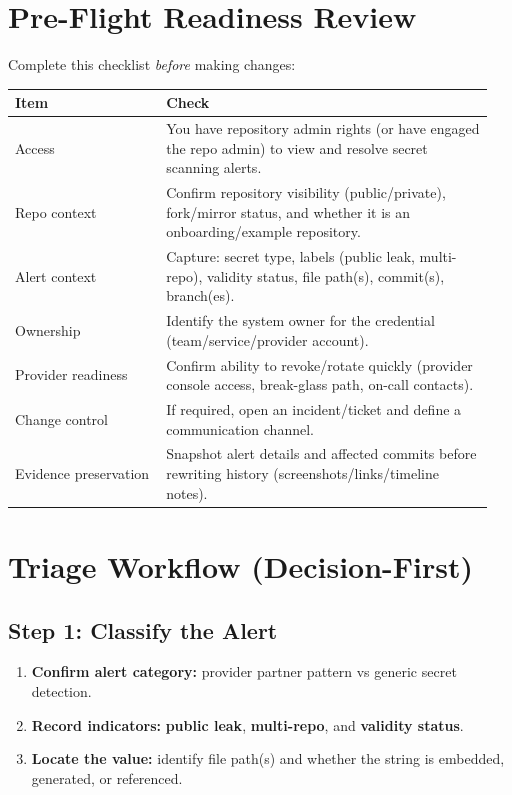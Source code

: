 \documentclass[11pt]{article}
\providecommand{\term}[1]{\textbf{#1}}
\begin{document}
\section{Pre-Flight Readiness Review}
Complete this checklist \emph{before} making changes:
\begin{longtable}{@{}p{0.30\linewidth}p{0.65\linewidth}@{}}
\toprule
\textbf{Item} & \textbf{Check} \\
\midrule
Access & You have repository admin rights (or have engaged the repo admin) to view and resolve secret scanning alerts. \\
Repo context & Confirm repository visibility (public/private), fork/mirror status, and whether it is an onboarding/example repository. \\
Alert context & Capture: secret type, labels (public leak, multi-repo), validity status, file path(s), commit(s), branch(es). \\
Ownership & Identify the system owner for the credential (team/service/provider account). \\
Provider readiness & Confirm ability to revoke/rotate quickly (provider console access, break-glass path, on-call contacts). \\
Change control & If required, open an incident/ticket and define a communication channel. \\
Evidence preservation & Snapshot alert details and affected commits before rewriting history (screenshots/links/timeline notes). \\
\bottomrule
\end{longtable}

\section{Triage Workflow (Decision-First)}
\subsection{Step 1: Classify the Alert}
\begin{enumerate}
  \item \textbf{Confirm alert category:} provider partner pattern vs generic secret detection.
  \item \textbf{Record indicators:} \term{public leak}, \term{multi-repo}, and \term{validity status}.
  \item \textbf{Locate the value:} identify file path(s) and whether the string is embedded, generated, or referenced.
\end{enumerate}
\end{document}
